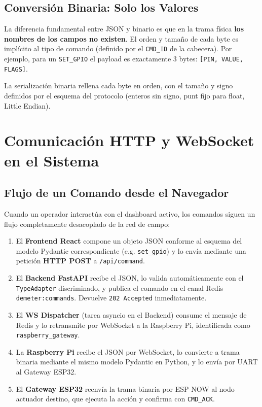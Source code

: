 \subsection{Conversión Binaria: Solo los Valores}

La diferencia fundamental entre JSON y binario es que en la trama física
\textbf{los nombres de los campos no existen}. El orden y tamaño de cada byte es implícito
al tipo de comando (definido por el \texttt{CMD\_ID} de la cabecera). Por ejemplo, para un
\texttt{SET\_GPIO} el payload es exactamente 3 bytes: \texttt{[PIN, VALUE, FLAGS]}.

La serialización binaria rellena cada byte en orden, con el tamaño y signo definidos por
el esquema del protocolo (enteros sin signo, punt fijo para float, Little Endian).

\section{Comunicación HTTP y WebSocket en el Sistema}
\label{sec:http_ws}

\subsection{Flujo de un Comando desde el Navegador}

Cuando un operador interactúa con el dashboard activo, los comandos siguen un flujo
completamente desacoplado de la red de campo:

\begin{enumerate}
    \item El \textbf{Frontend React} compone un objeto JSON conforme al esquema del modelo
          Pydantic correspondiente (e.g. \texttt{set\_gpio}) y lo envía mediante una petición
          \textbf{HTTP POST} a \texttt{/api/command}.
    \item El \textbf{Backend FastAPI} recibe el JSON, lo valida automáticamente con el
          \texttt{TypeAdapter} discriminado, y publica el comando en el canal Redis
          \texttt{demeter:commands}. Devuelve \texttt{202 Accepted} inmediatamente.
    \item El \textbf{WS Dispatcher} (tarea asyncio en el Backend) consume el mensaje de Redis
          y lo retransmite por WebSocket a la Raspberry Pi, identificada como
          \texttt{raspberry\_gateway}.
    \item La \textbf{Raspberry Pi} recibe el JSON por WebSocket, lo convierte a trama binaria
          mediante el mismo modelo Pydantic en Python, y lo envía por UART al Gateway ESP32.
    \item El \textbf{Gateway ESP32} reenvía la trama binaria por ESP-NOW al nodo actuador
          destino, que ejecuta la acción y confirma con \texttt{CMD\_ACK}.
\end{enumerate}

